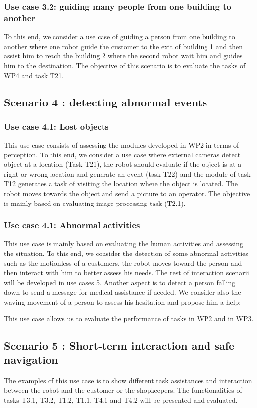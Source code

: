 \subsubsection{Use case 3.2: guiding many people from one building to another}
To this end,  we consider a use case  of guiding a person from one building to another where one robot guide the customer to the exit of building 1 and then  assist him to reach the building 2 where the second robot wait him and guides him to the destination. 
The objective of this scenario is to evaluate the tasks of WP4 and task T21. 

\subsection{ Scenario 4 : detecting abnormal events}
\subsubsection*{Use case 4.1: Lost objects}
This use case consists of assessing the modules developed in WP2 in terms of perception. To this end, we consider a use case where external cameras detect object at a location (Task T21), the robot should evaluate if the  object is at a right or wrong location and generate an event (task T22) and the module of task T12 generates a task of visiting the location where the object is located. The robot moves towards the object and send a picture to an operator. 
The objective is mainly based on evaluating image processing task (T2.1).
\subsubsection*{Use case 4.1: Abnormal activities}
This use case is mainly based on evaluating the human activities and assessing the situation. To this end, we consider the detection of some abnormal activities such as 
 the motionless of a customers, the robot moves toward the person and then interact with him to better assess his needs. The rest of interaction scenarii will be developed in use cases 5. Another aspect is to detect a person falling down to send a message for medical assistance if needed. We consider also the waving movement of a person to assess his hesitation and propose him a help;  

This use case allows us to evaluate the performance of tasks in WP2 and in WP3. 

\subsection{Scenario 5 : Short-term interaction and safe navigation}
The examples of this use case is to show different task assistances and interaction between the robot and the customer or the shopkeepers. The functionalities of tasks T3.1, T3.2, T1.2, T1.1, T4.1 and T4.2 will be presented and evaluated. 

